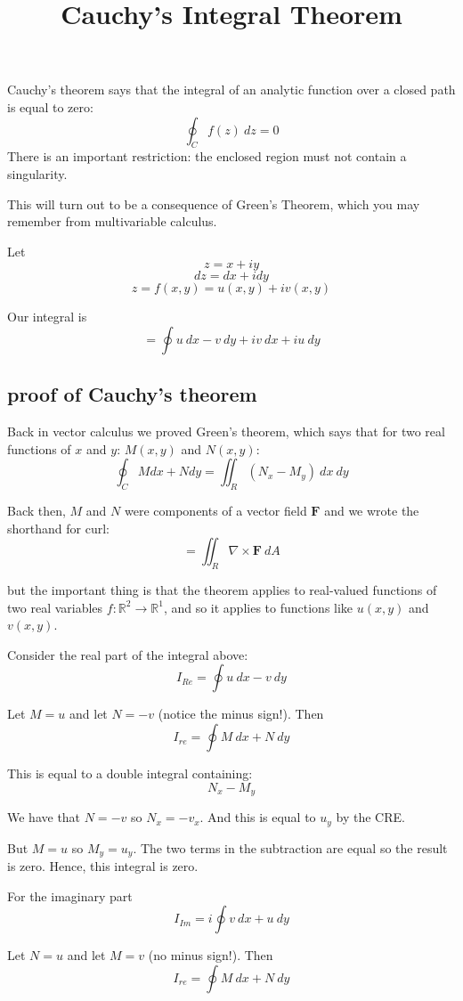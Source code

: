 \documentclass[11pt, oneside]{article}
\title{Cauchy's Integral Theorem}
\date{}
\begin{document}
\maketitle
\Large


Cauchy's theorem says that the integral of an analytic function over a closed path is equal to zero:
\[ \oint_C f(z) \ dz = 0 \]
There is an important restriction:  the enclosed region must not contain a singularity.

This will turn out to be a consequence of Green's Theorem, which you may remember from multivariable calculus.  

Let
\[ z = x + i y \]
\[ dz = dx + i dy \]
\[ z = f(x,y) = u(x,y) + iv(x,y) \]

Our integral is
\[ =  \oint u \ dx - v \ dy + i v \ dx + i u \ dy \]

\subsection*{proof of Cauchy's theorem}
Back in vector calculus we proved Green's theorem, which says that for two real functions of $x$ and $y$:  $M(x,y)$ and $N(x,y)$:
\[ \oint_C M dx + N dy = \iint_R (N_x - M_y) \ dx \ dy \]

Back then, $M$ and $N$ were components of a vector field $\mathbf{F}$ and we wrote the shorthand for curl:
\[ = \iint_R \nabla \times \mathbf{F} \ dA\]

but the important thing is that the theorem applies to real-valued functions of two real variables $f: \mathbb{R}^2 \rightarrow \mathbb{R}^1$, and so it applies to functions like $u(x,y)$ and $v(x,y)$.

Consider the real part of the integral above:
\[ I_{Re} = \oint u \ dx - v \ dy \]

Let $M = u$ and let $N = - v$ (notice the minus sign!).  Then
\[ I_{re} = \oint M \ dx + N \ dy \]

This is equal to a double integral containing:
\[ N_x - M_y \]

We have that $N = -v$ so $N_x = - v_x$.  And this is equal to $u_y$ by the CRE.

But $M = u$ so $M_y = u_y$. The two terms in the subtraction are equal so the result is zero.  Hence, this integral is zero.

For the imaginary part 
\[ I_{Im} = i \oint v \ dx + u \ dy \]

Let $N = u$ and let $M = v$ (no minus sign!).  Then
\[ I_{re} = \oint M \ dx + N \ dy \]
\end{document}
